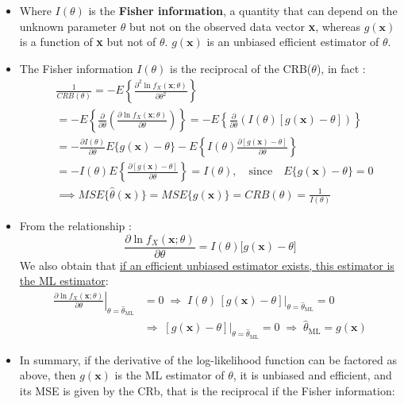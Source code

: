 \begin{itemize}
    \item Where \(I(\theta)\) is the \textbf{Fisher information}, a quantity that can depend on the unknown parameter \(\theta\) but not on the observed data vector \textbf{x}, whereas \(g(\mathbf{x})\) is a function of \textbf{x} but not of \(\theta\). \(g(\textbf{x})\) is an unbiased efficient estimator of \(\theta\).
    \item The Fisher information \(I(\theta)\) is the reciprocal of the CRB(\(\theta\)), in fact :
    \[
    \begin{aligned}
    &\frac{1}{CRB(\theta)} = -E \left\{ \frac{\partial^2 \ln f_X (\mathbf{x}; \theta)}{\partial \theta^2} \right\}\\[5pt]
    &= -E \left\{ \frac{\partial}{\partial \theta} \left( \frac{\partial \ln f_X(\mathbf{x};\theta)}{\partial \theta} \right) \right\}= -E \left\{ \frac{\partial}{\partial \theta} \left( I(\theta)[g(\mathbf{x})-\theta] \right) \right\}\\[5pt]
    &= -\frac{\partial I(\theta)}{\partial \theta} E \{g(\mathbf{x})-\theta\} - E \left\{ I(\theta) \frac{\partial [g(\mathbf{x})-\theta]}{\partial \theta}\right\}\\[5pt]
    &= -I(\theta) E \left\{ \frac{\partial [g(\mathbf{x})-\theta]}{\partial \theta}\right\}= I(\theta), \quad \text{since}\quad E\{g(\mathbf{x})-\theta\}=0\\[5pt]
    &\implies MSE\{\hat{\theta}(\mathbf{x})\} = MSE\{g(\mathbf{x})\} = CRB(\theta) = \frac{1}{I(\theta)}
    \end{aligned}
    \]
    \item From the relationship :
\[
\frac{\partial \ln f_{X}(\mathbf{x};\theta)}{\partial \theta}
= I(\theta)\big[g(\mathbf{x})-\theta\big]
\]
    We also obtain that \underline{if an efficient unbiased estimator exists, this estimator is the ML estimator}:
    \begin{align*}
\left.\frac{\partial \ln f_{X}(\mathbf{x};\theta)}{\partial \theta}\right|_{\theta=\hat{\theta}_{\mathrm{ML}}} &= 0
\;\Rightarrow\;
\left.I(\theta)\,[g(\mathbf{x})-\theta]\right|_{\theta=\hat{\theta}_{\mathrm{ML}}} = 0 \\
&\Rightarrow\;
\left.[g(\mathbf{x})-\theta]\right|_{\theta=\hat{\theta}_{\mathrm{ML}}} = 0
\;\Rightarrow\;
\hat{\theta}_{\mathrm{ML}} = g(\mathbf{x})
\end{align*}
    \item In summary, if the derivative of the log-likelihood function can be factored as above, then \(g(\textbf{x})\) is the ML estimator of \(\theta\), it is unbiased and efficient, and its MSE is given by the CRb, that is the reciprocal if the Fisher information:

\end{itemize}
